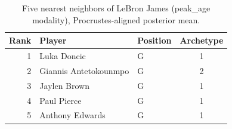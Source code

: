 \begin{table}[htbp]
  \centering\small
  \begin{tabular}{rllc}
    \toprule
    Rank & Player & Position & Archetype \\
    \midrule
    1 & Luka Doncic & G & 1 \\
    2 & Giannis Antetokounmpo & G & 2 \\
    3 & Jaylen Brown & G & 1 \\
    4 & Paul Pierce & G & 1 \\
    5 & Anthony Edwards & G & 1 \\
    \bottomrule
  \end{tabular}
  \caption{Five nearest neighbors of LeBron James (peak_age modality), Procrustes-aligned posterior mean.}
  \label{tab:LeBron_James_neighbors_peak_age}
\end{table}

